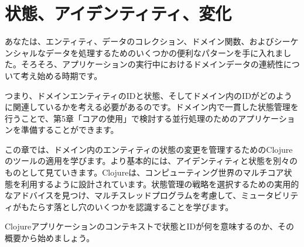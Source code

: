 \chapter{状態、アイデンティティ、変化}

あなたは、エンティティ、データのコレクション、ドメイン関数、およびシーケンシャルなデータを処理するためのいくつかの便利なパターンを手に入れました。そろそろ、アプリケーションの実行中におけるドメインデータの連続性について考え始める時期です。

つまり、ドメインエンティティのIDと状態、そしてドメイン内のIDがどのように関連しているかを考える必要があるのです。ドメイン内で一貫した状態管理を行うことで、第5章「コアの使用」で検討する並行処理のためのアプリケーションを準備することができます。

この章では、ドメイン内のエンティティの状態の変更を管理するためのClojureのツールの適用を学びます。より基本的には、アイデンティティと状態を別々のものとして見ていきます。Clojureは、コンピューティング世界のマルチコア状態を利用するように設計されています。状態管理の戦略を選択するための実用的なアドバイスを見つけ、マルチスレッドプログラムを考慮して、ミュータビリティがもたらす落とし穴のいくつかを認識することを学びます。

Clojureアプリケーションのコンテキストで状態とIDが何を意味するのか、その概要から始めましょう。


